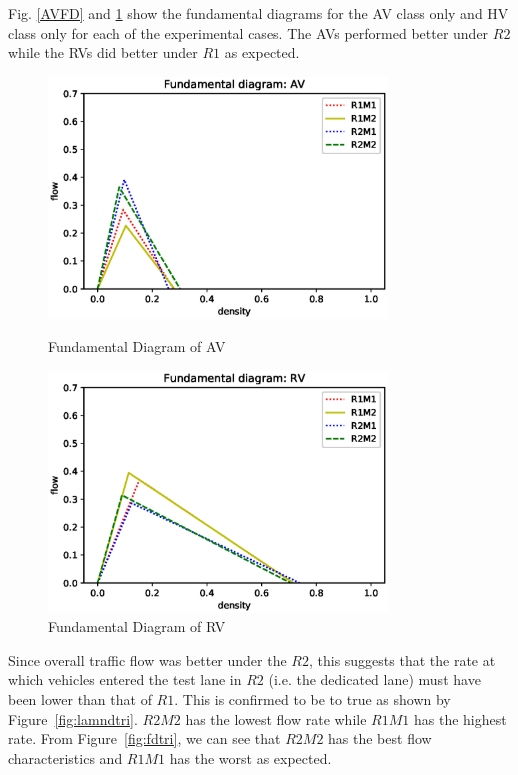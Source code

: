 \documentclass[oneside,letter,11pt]{article}
\begin{document}
Fig. \ref{AVFD} and \ref{rvfd} show the fundamental diagrams for the AV class only and HV class only for each of the experimental cases. The AVs performed better under $R2$ while the RVs did better under $R1$ as expected.
\begin{figure}[H]
  \centering
  \begin{minipage}[b]{0.4\textwidth}
    \includegraphics[width=9cm]{tricompav.eps}
        \vspace{-1cm}
    \caption{\hspace{-0.3cm}Fundamental Diagram of AV}
    \label{AVFD}
  \end{minipage}
  \hfill
  \begin{minipage}[b]{0.4\textwidth}
    \includegraphics[width=9cm]{tricomprv.eps}
        \vspace{-1cm}
    \caption{\hspace{-0.3cm}Fundamental Diagram of RV}
    \label{rvfd}
  \end{minipage}
\end{figure}

Since overall traffic flow was better under the $R2$, this suggests that the rate at which vehicles entered the test lane in $R2$ (i.e. the dedicated lane) must have been lower than that of $R1$. This is confirmed to be to true as shown by Figure~\ref{fig:lamndtri}. $R2M2$ has the lowest flow rate while $R1M1$ has the highest rate. From Figure~\ref{fig:fdtri}, we can see that $R2M2$ has the best flow characteristics and $R1M1$ has the worst as expected.
\end{document}
